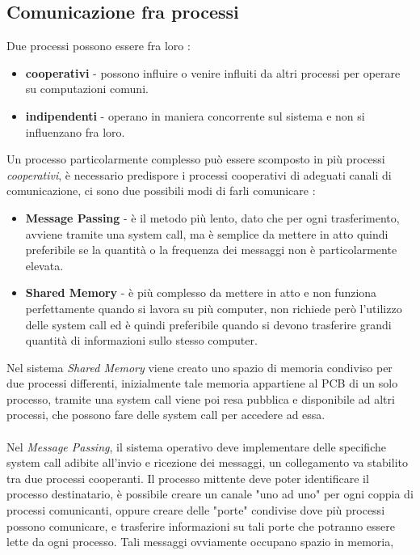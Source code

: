\documentclass[12pt, letterpaper]{article}
\begin{document}
\subsection{Comunicazione fra processi}
Due processi possono essere fra loro :  \begin{itemize}
    \item \textbf{cooperativi} - possono influire o venire influiti da altri processi per operare su computazioni comuni.
    \item \textbf{indipendenti} - operano in maniera concorrente sul sistema e non si influenzano fra loro.
\end{itemize}
Un processo particolarmente complesso può essere scomposto in più processi \textit{cooperativi}, 
è necessario predispore i processi cooperativi di adeguati canali di comunicazione, ci sono due possibili 
modi di farli comunicare :\begin{itemize}
    \item \textbf{Message Passing} - è il metodo più lento, dato che per ogni trasferimento, avviene tramite
    una system call, ma è semplice da mettere in atto quindi preferibile se la quantità o la frequenza dei messaggi 
    non è particolarmente elevata.
    \item \textbf{Shared Memory} - è più complesso da mettere in atto e non funziona perfettamente quando si lavora 
    su più computer, non richiede però l'utilizzo delle system call ed è quindi preferibile quando si devono 
    trasferire grandi quantità di informazioni sullo stesso computer.
\end{itemize}
Nel sistema \textit{Shared Memory} viene creato uno spazio di memoria condiviso per due processi differenti, inizialmente 
tale memoria appartiene al PCB di un solo processo, tramite una system call viene poi resa pubblica e disponibile 
ad altri processi, che possono fare delle system call per accedere ad essa.
\\\hphantom{}\\ 
Nel \textit{Message Passing}, il sistema operativo deve implementare delle specifiche system call adibite 
all'invio e ricezione dei messaggi, un collegamento va stabilito tra due processi cooperanti. Il processo 
mittente deve poter identificare il processo destinatario, è possibile creare un canale "uno ad uno" per 
ogni coppia di processi comunicanti, oppure creare delle "porte" condivise dove più processi possono 
comunicare, e trasferire informazioni su tali porte che potranno essere lette da ogni processo. Tali messaggi 
ovviamente occupano spazio in memoria,
\end{document}

